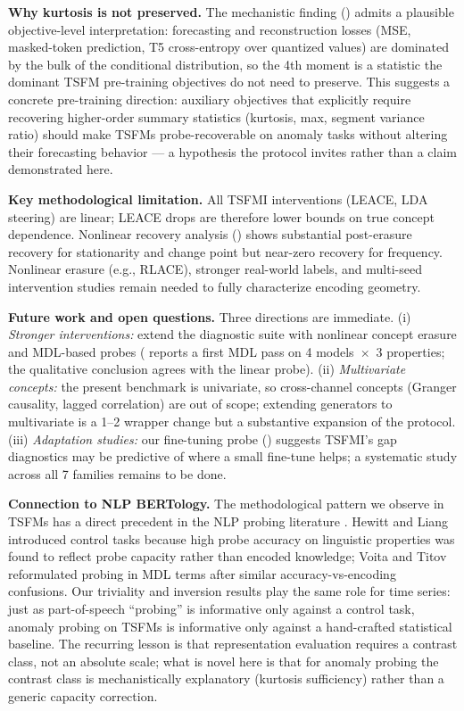 \documentclass{article}
\begin{document}
\textbf{Why kurtosis is not preserved.} The mechanistic finding () admits a plausible objective-level interpretation: forecasting and reconstruction losses (MSE, masked-token prediction, T5 cross-entropy over quantized values) are dominated by the bulk of the conditional distribution, so the 4th moment is a statistic the dominant TSFM pre-training objectives do not need to preserve. This suggests a concrete pre-training direction: auxiliary objectives that explicitly require recovering higher-order summary statistics (kurtosis, max, segment variance ratio) should make TSFMs probe-recoverable on anomaly tasks without altering their forecasting behavior --- a hypothesis the protocol invites rather than a claim demonstrated here.

\textbf{Key methodological limitation.} All TSFMI interventions (LEACE, LDA steering) are linear; LEACE drops are therefore lower bounds on true concept dependence. Nonlinear recovery analysis () shows substantial post-erasure recovery for stationarity and change point but near-zero recovery for frequency. Nonlinear erasure (e.g., RLACE), stronger real-world labels, and multi-seed intervention studies remain needed to fully characterize encoding geometry.

\textbf{Future work and open questions.} Three directions are immediate. (i) \emph{Stronger interventions:} extend the diagnostic suite with nonlinear concept erasure and MDL-based probes ( reports a first MDL pass on 4 models~$\times$~3 properties; the qualitative conclusion agrees with the linear probe). (ii) \emph{Multivariate concepts:} the present benchmark is univariate, so cross-channel concepts (Granger causality, lagged correlation) are out of scope; extending generators to multivariate is a 1--2 wrapper change but a substantive expansion of the protocol. (iii) \emph{Adaptation studies:} our fine-tuning probe () suggests TSFMI's gap diagnostics may be predictive of where a small fine-tune helps; a systematic study across all 7 families remains to be done.

\textbf{Connection to NLP BERTology.} The methodological pattern we observe in TSFMs has a direct precedent in the NLP probing literature \cite{Rogers2021}. Hewitt and Liang \cite{HewittLiang2019} introduced control tasks because high probe accuracy on linguistic properties was found to reflect probe capacity rather than encoded knowledge; Voita and Titov \cite{Voita2020} reformulated probing in MDL terms after similar accuracy-vs-encoding confusions. Our triviality and inversion results play the same role for time series: just as part-of-speech ``probing'' is informative only against a control task, anomaly probing on TSFMs is informative only against a hand-crafted statistical baseline. The recurring lesson is that representation evaluation requires a contrast class, not an absolute scale; what is novel here is that for anomaly probing the contrast class is mechanistically explanatory (kurtosis sufficiency) rather than a generic capacity correction.
\end{document}
